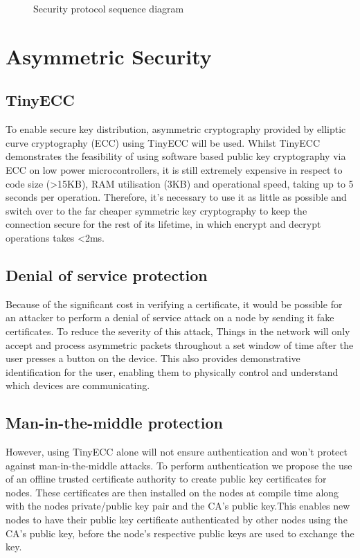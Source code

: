 \documentclass[conference]{./sty/IEEEtran}
\begin{document}
\begin{figure}[h!]
\begin{center}

\caption{Security protocol sequence diagram}
\label{fig:sequence_diagram}
\end{center}
\end{figure}

\section{Asymmetric Security} %
\label{sec:asymmetric_security}
\subsection{TinyECC} %
\label{sub:tinyecc}
To enable secure key distribution, asymmetric cryptography provided by elliptic curve cryptography (ECC) using TinyECC\cite{TinyECC} will be used. Whilst TinyECC demonstrates the feasibility of using software based public key cryptography via ECC on low power microcontrollers, it is still extremely expensive in respect to code size (\textgreater15KB), RAM utilisation (3KB) and operational speed, taking up to 5 seconds per operation. Therefore, it's necessary to use it as little as possible and switch over to the far cheaper symmetric key cryptography to keep the connection secure for the rest of its lifetime, in which encrypt and decrypt operations takes \textless 2ms.

\subsection{Denial of service protection} %
\label{sub:denial_of_service_protection}
Because of the significant cost in verifying a certificate, it would be possible for an attacker to perform a denial of service attack on a node by sending it fake certificates. To reduce the severity of this attack, Things in the network will only accept and process asymmetric packets throughout a set window of time after the user presses a button on the device. This also provides demonstrative identification for the user, enabling them to physically control and understand which devices are communicating.

\subsection{Man-in-the-middle protection} %
\label{sub:man_in_the_middle_protection}
However, using TinyECC alone will not ensure authentication and won't protect against man-in-the-middle attacks. To perform authentication we propose the use of an offline trusted certificate authority to create public key certificates for nodes. These certificates are then installed on the nodes at compile time along with the nodes private/public key pair and the CA's public key.This enables new nodes to have their public key certificate authenticated by other nodes using the CA's public key, before the node's respective public keys are used to exchange the key.
\end{document}
